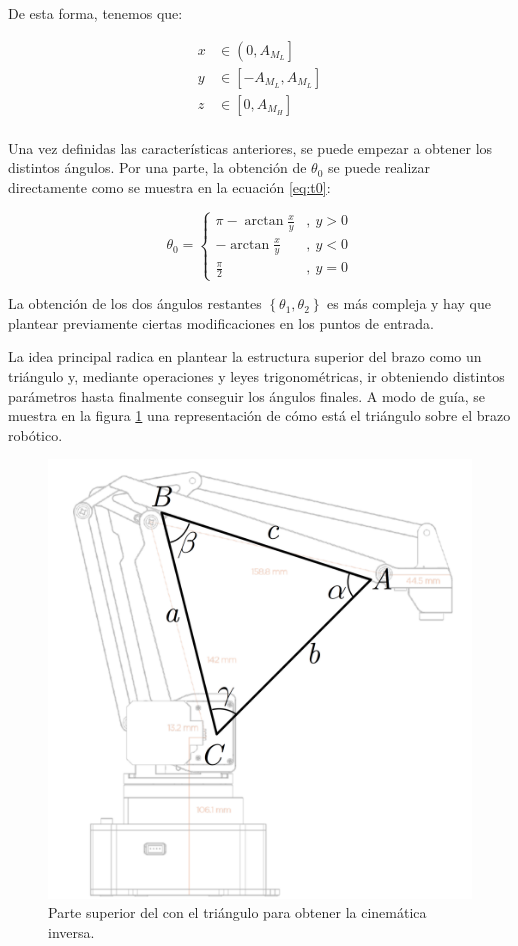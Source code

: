 De esta forma, tenemos que:

\begin{align*}
    x & \in \left(0, A_{M_L}\right] \\
    y & \in \left[-A_{M_L}, A_{M_L}\right] \\
    z & \in \left[0, A_{M_H}\right] \\
\end{align*}

Una vez definidas las características anteriores, se puede empezar a obtener los distintos
ángulos. Por una parte, la obtención de $\theta_0$ se puede realizar directamente como
se muestra en la ecuación \ref{eq:t0}:

\begin{equation}\label{eq:t0}
    \theta_0 = \left\{\begin{aligned}
        \pi - \arctan{\frac{x}{y}} &,~y > 0 \\
        - \arctan{\frac{x}{y}} &,~y < 0 \\
        \frac{\pi}{2} &,~y = 0
    \end{aligned}
    \right.
\end{equation}

La obtención de los dos ángulos restantes $\left\{\theta_1, \theta_2\right\}$ es más
compleja y hay que plantear previamente ciertas modificaciones en los puntos de entrada.

La idea principal radica en plantear la estructura superior del brazo como un triángulo
y, mediante operaciones y leyes trigonométricas, ir obteniendo distintos parámetros hasta
finalmente conseguir los ángulos finales. A modo de guía, se muestra en la figura
\ref{fig:ik_over_arm} una representación de cómo está el triángulo sobre el brazo
robótico.

\begin{figure}[H]
    \centering
    \includegraphics[width=.5\linewidth]{pictures/ik_cosine_law_over_arm.png}
    \caption{Parte superior del \pArm{} con el triángulo para obtener la cinemática inversa.}
    \label{fig:ik_over_arm}
\end{figure}

